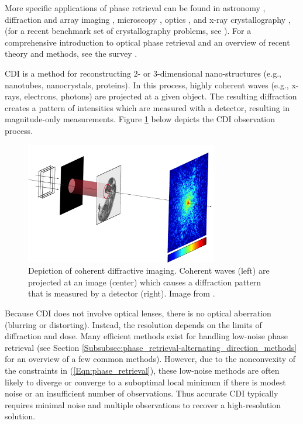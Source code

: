 More specific applications of phase retrieval can be found in astronomy \cite{fienup1987phase}, diffraction and array imaging \cite{bunk2007diffractive} \cite{chai2010array}, microscopy \cite{miao2008extending}, optics \cite{walther1963question}, and x-ray crystallography \cite{harrison1993phase}, \cite{millane1990phase} (for a recent benchmark set of crystallography problems, see \cite{elser2017benchmark}).  For a comprehensive introduction to optical phase retrieval and an overview of recent theory and methods, see the survey \cite{DBLP:journals/spm/ShechtmanECCMS15}.


CDI is a method for reconstructing $2$- or $3$-dimensional nano-structures (e.g., nanotubes, nanocrystals, proteins).  In this process, highly coherent waves (e.g., x-rays, electrons, photons) are projected at a given object.  The resulting diffraction creates a pattern of intensities which are measured with a detector, resulting in magnitude-only measurements.  Figure \ref{Fig:CDI} below depicts the CDI observation process.

\begin{figure}[H]
  \centering
    \includegraphics[width=0.75\textwidth]{phase_retrieval_depiction_mod.jpg}
   \caption{Depiction of coherent diffractive imaging.  Coherent waves (left) are projected at an image (center) which causes a diffraction pattern that is measured by a detector (right). Image from \cite{Guizar-Sicairos}.}
   \label{Fig:CDI}
\end{figure}

Because CDI does not involve optical lenses, there is no optical aberration (blurring or distorting).  Instead, the resolution depends on the limits of diffraction and dose.  Many efficient methods exist for handling low-noise phase retrieval (see Section \ref{Subsubsec:phase_retrieval-alternating_direction_methods} for an overview of a few common methods).  However, due to the nonconvexity of the constraints in (\ref{Eqn:phase_retrieval}), these low-noise methods are often likely to diverge or converge to a suboptimal local minimum if there is modest noise or an insufficient number of observations.  Thus accurate CDI typically requires minimal noise and multiple observations to recover a high-resolution solution.




